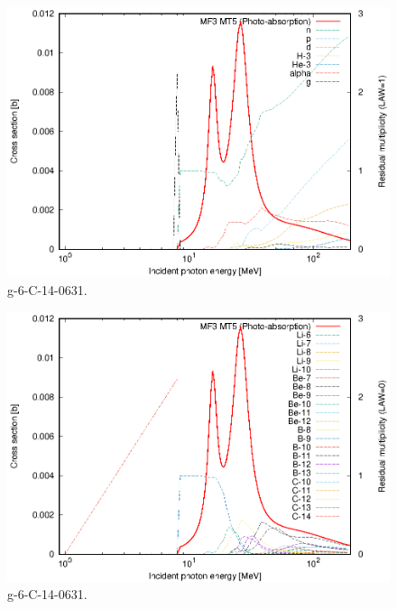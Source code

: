 \begin{figure}
 \includegraphics[width=\linewidth]{eps/g_6-C-14_0631.eps}
  \caption{g-6-C-14-0631.}
\end{figure}
\begin{figure}
 \includegraphics[width=\linewidth]{eps-law0/g_6-C-14_0631.eps}
 \caption{g-6-C-14-0631.}
\end{figure}
\newpage \clearpage

